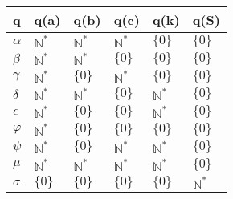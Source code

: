     \tiny
    \begin{tabular}{|L{0.2cm}||L{0.2cm}|L{0.2cm}|L{0.2cm}|L{0.2cm}|L{0.2cm}|}
    \hline
    q&q(a)&q(b)&q(c)&q(k)&q(S)\\\hline
    $\alpha$&$\mathbb{N}^*$&$\mathbb{N}^*$&$\mathbb{N}^*$&$\{0\}$&$\{0\}$\\\hline
    $\beta$&$\mathbb{N}^*$&$\mathbb{N}^*$&$\{0\}$&$\{0\}$&$\{0\}$\\\hline
    $\gamma$&$\mathbb{N}^*$&$\{0\}$&$\mathbb{N}^*$&$\{0\}$&$\{0\}$\\\hline
    $\delta$&$\mathbb{N}^*$&$\mathbb{N}^*$&$\{0\}$&$\mathbb{N}^*$&$\{0\}$\\\hline
    $\epsilon$&$\mathbb{N}^*$&$\{0\}$&$\{0\}$&$\mathbb{N}^*$&$\{0\}$\\\hline
    $\varphi$&$\mathbb{N}^*$&$\{0\}$&$\{0\}$&$\{0\}$&$\{0\}$\\\hline
    $\psi$&$\mathbb{N}^*$&$\{0\}$&$\mathbb{N}^*$&$\mathbb{N}^*$&$\{0\}$\\\hline
    $\mu$&$\mathbb{N}^*$&$\mathbb{N}^*$&$\mathbb{N}^*$&$\mathbb{N}^*$&$\{0\}$\\\hline
    $\sigma$&$\{0\}$&$\{0\}$&$\{0\}$&$\{0\}$&$\mathbb{N}^*$\\\hline
    \end{tabular}